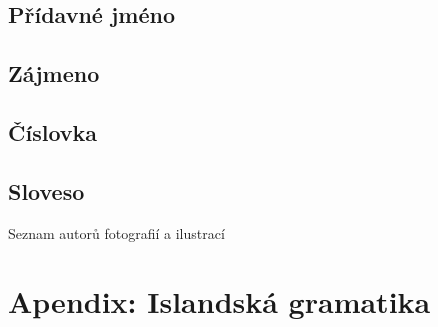 \section{Přídavné jméno}                         \label{sec:morpho_adj}
{\small{}}


\section{Zájmeno}                                \label{sec:morpho_pron}


\section{Číslovka}                               \label{sec:morpho_num}
{\small{}}

\section{Sloveso}                                \label{sec:morpho_v}



\twocolumn
\pagestyle{empty}

\cleardoublepage
{}
{}
  {Seznam autorů fotografií a ilustrací}         \label{sec:photo}
\printindex

\cleardoublepage
{}
{}
\nocite{*}
\printbibliography

\onecolumn
\pagestyle{empty}

\chapter{Apendix: Islandská gramatika}
%

\cleardoublepage\null\clearpage %
\vfill
\EANisbn[SC3]

\cleardoublepage\null\clearpage %
\makecover\backcoverimages
\fi

